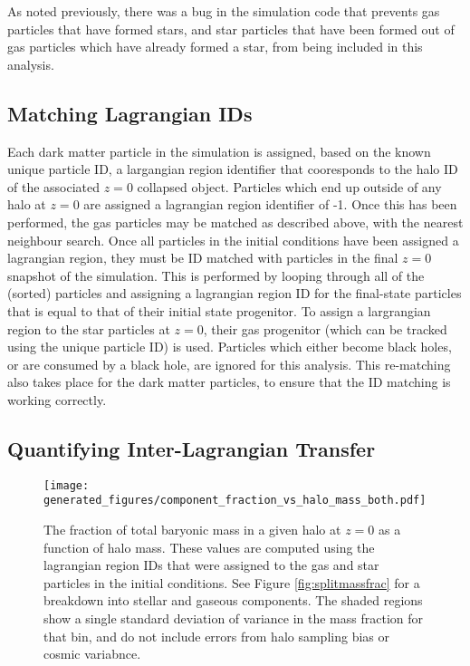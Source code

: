 As noted previously, there was a bug in the simulation code that prevents gas
particles that have formed stars, and star particles that have been formed
out of gas particles which have already formed a star, from being included in
this analysis.

\subsection{Matching Lagrangian IDs}

Each dark matter particle in the simulation is assigned, based on the known
unique particle ID, a largangian region identifier that cooresponds to the halo
ID of the associated $z=0$ collapsed object. Particles which end up outside of
any halo at $z=0$ are assigned a lagrangian region identifier of -1. Once this
has been performed, the gas particles may be matched as described above, with
the nearest neighbour search. Once all particles in the initial conditions have
been assigned a lagrangian region, they must be ID matched with particles in
the final $z=0$ snapshot of the simulation. This is performed by looping
through all of the (sorted) particles and assigning a lagrangian region ID for
the final-state particles that is equal to that of their initial state
progenitor. To assign a largrangian region to the star particles at $z=0$,
their gas progenitor (which can be tracked using the unique particle ID) is
used. Particles which either become black holes, or are consumed by a black
hole, are ignored for this analysis. This re-matching also takes place for the
dark matter particles, to ensure that the ID matching is working correctly.

\subsection{Quantifying Inter-Lagrangian Transfer}

\begin{figure} \centering
	\texttt{[image: generated\_figures/component\_fraction\_vs\_halo\_mass\_both.pdf]}
	\caption{The fraction of total baryonic mass in a given halo at $z=0$
	as a function of halo mass. These values are computed using the
	lagrangian region IDs that were assigned to the gas and star particles
	in the initial conditions. See Figure \ref{fig:splitmassfrac} for a
	breakdown into stellar and gaseous components. The shaded regions show
	a single standard deviation of variance in the mass fraction for that
	bin, and do not include errors from halo sampling bias or cosmic
	variabnce.} \label{fig:massfrac} \end{figure}


